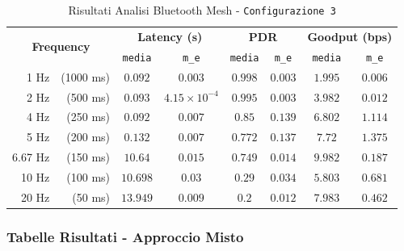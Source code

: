 \begin{table}[hbt!]
    \centering
    \begin{tabular}{ |rr|| c|c|c|c|c|c| } 
        \hline
        \multicolumn{2}{|c||}{\multirow{2}{*}{\textbf{Frequency}}} & \multicolumn{2}{|c|}{\textbf{Latency \scriptsize (s)}} & \multicolumn{2}{|c|}{\textbf{PDR}} & \multicolumn{2}{|c|}{\textbf{Goodput \scriptsize (bps)}} \\
        && \texttt{media} & \texttt{m\_e} & \texttt{media} & \texttt{m\_e} & \texttt{media} & \texttt{m\_e} \\

		\hline
		1 Hz & \scriptsize (1000 ms) & $ 0.092 $ & $ 0.003 $ & $ 0.998 $ & $ 0.003 $ & $ 1.995 $ & $ 0.006 $ \\
		\hline
		2 Hz & \scriptsize (500 ms) & $ 0.093 $ & $ 4.15 \times 10^{-4} $ & $ 0.995 $ & $ 0.003 $ & $ 3.982 $ & $ 0.012 $ \\
		\hline
		4 Hz & \scriptsize (250 ms) & $ 0.092 $ & $ 0.007 $ & $ 0.85 $ & $ 0.139 $ & $ 6.802 $ & $ 1.114 $ \\
		\hline
		5 Hz & \scriptsize (200 ms) & $ 0.132 $ & $ 0.007 $ & $ 0.772 $ & $ 0.137 $ & $ 7.72 $ & $ 1.375 $ \\
		\hline
		6.67 Hz & \scriptsize (150 ms) & $ 10.64 $ & $ 0.015 $ & $ 0.749 $ & $ 0.014 $ & $ 9.982 $ & $ 0.187 $ \\
		\hline
		10 Hz & \scriptsize (100 ms) & $ 10.698 $ & $ 0.03 $ & $ 0.29 $ & $ 0.034 $ & $ 5.803 $ & $ 0.681 $ \\
		\hline
		20 Hz & \scriptsize (50 ms) & $ 13.949 $ & $ 0.009 $ & $ 0.2 $ & $ 0.012 $ & $ 7.983 $ & $ 0.462 $ \\
		\hline
    \end{tabular}
    \caption{Risultati Analisi Bluetooth Mesh - \texttt{Configurazione 3}}
    \label{tab:table_ble_conf_3}
\end{table}

\newpage
\subsubsection{Tabelle Risultati - Approccio Misto}
\label{apex:outcomes_ble_wifi_mesh}

